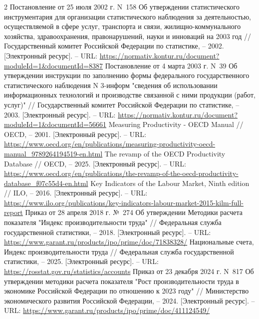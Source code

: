 \documentclass{article}
\begin{document}
\begin{thebibliography}{2}
 Постановление от 25 июля 2002 г. N~158 Об утверждении статистического инструментария для организации статистического наблюдения за деятельностью, осуществляемой в сфере услуг, транспорта и связи, жилищно-коммунального хозяйства, здравоохранения, правонарушений, науки и инноваций на 2003 год // Государственный комитет Российской Федерации по статистике, – 2002. [Электронный ресурс]. – URL: \url{https://normativ.kontur.ru/document?moduleId=1&documentId=8387}
 Постановление от 4 марта 2003 г. N~39 Об утверждении инструкции по заполнению формы федерального государственного статистического наблюдения N 3-информ "сведения об использовании информационных технологий и производстве связанной с ними продукции (работ, услуг)" // Государственный комитет Российской Федерации по статистике, – 2003. [Электронный ресурс]. – URL: \url{https://normativ.kontur.ru/document?moduleId=1&documentId=56661}
 Measuring Productivity - OECD Manual // OECD, – 2001. [Электронный ресурс]. – URL: \url{https://www.oecd.org/en/publications/measuring-productivity-oecd-manual_9789264194519-en.html}
 The revamp of the OECD Productivity Database // OECD, – 2025. [Электронный ресурс]. – URL: \url{https://www.oecd.org/en/publications/the-revamp-of-the-oecd-productivity-database_f07c55d4-en.html}
 Key Indicators of the Labour Market, Ninth edition // ILO, – 2016. [Электронный ресурс]. – URL: \url{https://www.ilo.org/publications/key-indicators-labour-market-2015-kilm-full-report}
 Приказ от 28 апреля 2018 г. №~274 Об утверждении Методики расчета показателя "Индекс производительности труда" // Федеральная служба государственной статистики, – 2018. [Электронный ресурс]. – URL: \url{https://www.garant.ru/products/ipo/prime/doc/71838328/}
 Национальные счета, Индекс производительности труда // Федеральная служба государственной статистики, – 2025. [Электронный ресурс]. – URL: \url{https://rosstat.gov.ru/statistics/accounts}
 Приказ от 23 декабря 2024 г. N~817 Об утверждении методики расчета показателя "Рост производительности труда в экономике Российской Федерации по отношению к 2023 году" // Министерство экономического развития Российской Федерации, – 2024. [Электронный ресурс]. – URL: \url{https://www.garant.ru/products/ipo/prime/doc/411124549/}

\end{thebibliography}
\end{document}

